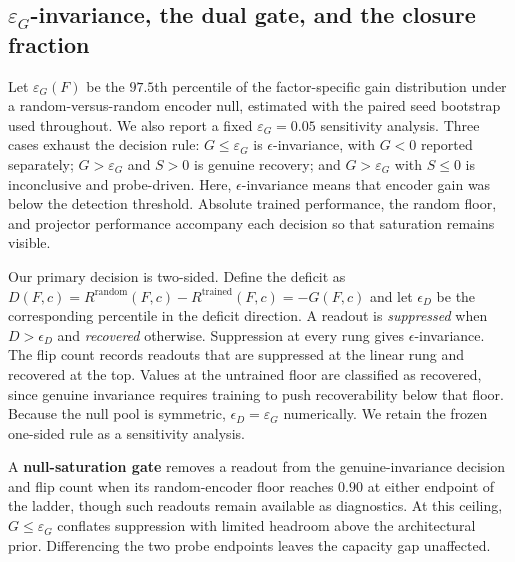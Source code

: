 \documentclass[10pt]{article}
\newcommand{\R}{R}
\newcommand{\Sel}{S}
\newcommand{\G}{G}
\newcommand{\epsG}{\varepsilon_G}
\begin{document}
\subsection{\texorpdfstring{$\epsG$}{epsilon-G}-invariance, the dual gate, and the closure fraction}
\label{sec:closuredef}
Let $\epsG(F)$ be the $97.5$th percentile of the factor-specific gain distribution under a
random-versus-random encoder null, estimated with the paired seed bootstrap used throughout. We
also report a fixed $\epsG = 0.05$ sensitivity analysis. Three cases exhaust the decision rule:
$\G \le \epsG$ is $\epsilon$-invariance, with $\G < 0$ reported separately; $\G > \epsG$ and
$\Sel > 0$ is genuine recovery; and $\G > \epsG$ with $\Sel \le 0$ is inconclusive and
probe-driven. Here, $\epsilon$-invariance means that encoder gain was below the detection threshold.
Absolute trained performance, the random floor, and projector performance accompany each decision
so that saturation remains visible.

Our primary decision is two-sided. Define the deficit as $D(F,c) = \R^{\mathrm{random}}(F,c) -
\R^{\mathrm{trained}}(F,c) = -\G(F,c)$ and let $\epsilon_D$ be the corresponding percentile in the
deficit direction. A readout is \emph{suppressed} when $D > \epsilon_D$ and \emph{recovered}
otherwise. Suppression at every rung gives $\epsilon$-invariance. The flip count records readouts
that are suppressed at the linear rung and recovered at the top. Values at the untrained floor are
classified as recovered, since genuine invariance requires training to push recoverability below
that floor. Because the null pool is symmetric, $\epsilon_D = \epsG$ numerically. We retain the
frozen
one-sided rule as a sensitivity analysis.

A \textbf{null-saturation gate} removes a readout from the genuine-invariance decision and flip
count
when its random-encoder floor reaches $0.90$ at either endpoint of the ladder, though such readouts
remain available as diagnostics. At this ceiling, $\G \le \epsG$ conflates suppression with limited
headroom above the architectural prior. Differencing the two probe endpoints leaves the capacity gap
unaffected.
\end{document}
